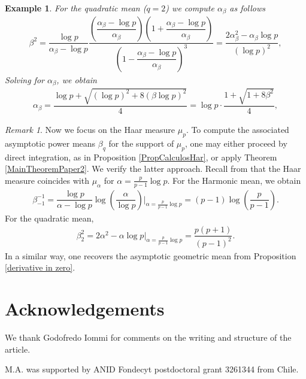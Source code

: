 \documentclass[11pt]{amsart}
\newtheorem{example}{Example}
\theoremstyle{remark}
\newtheorem{remark}[theorem]{Remark}
\numberwithin{equation}{section}
\begin{document}
\begin{example}
    For the quadratic mean ($q=2$) we compute $\alpha_{\beta}$ as follows
    \begin{align*}
        \beta^{2}=\dfrac{\log p}{\alpha_{\beta}-\log p}\dfrac{\left(\dfrac{\alpha_{\beta}-\log p}{\alpha_{\beta}}\right)\left(1+\dfrac{\alpha_{\beta}-\log p}{\alpha_{\beta}}\right)}{\left(1-\dfrac{\alpha_{\beta}-\log p}{\alpha_{\beta}}\right)^{3}}=\dfrac{2\alpha_{\beta}^{2}-\alpha_{\beta}\log p}{\left(\log p\right)^2},
    \end{align*}Solving for $\alpha_\beta$, we obtain
    \begin{align*}
        \alpha_{\beta}=\dfrac{\log p+\sqrt{(\log p)^{2}+8(\beta\log p)^{2}}}{4}=\log p\cdot \dfrac{1+\sqrt{1+8\beta^2}}{4},
    \end{align*}
\end{example}

\begin{remark}
    Now we focus on the Haar measure $\mu_{p}$. To compute the associated asymptotic power means $\beta_{q}$ for the support of $\mu_{p}$, one may either proceed by direct integration, as in Proposition \ref{PropCalculosHar}, or apply Theorem \ref{MainTheoremPaper2}. We verify the latter approach. Recall from \cite[Remark 4.2]{paper1} that the Haar measure coincides with $\mu_{\alpha}$ for $\alpha=\frac{p}{p-1}\log p$. For the Harmonic mean, we obtain
    \begin{align*}
        \beta_{-1}^{-1}=\dfrac{\log p}{\alpha-\log p}\log\left(\dfrac{\alpha}{\log p}\right)\bigg\lvert_{\alpha=\frac{p}{p-1}\log p}=(p-1)\log\left(\dfrac{p}{p-1}\right).
    \end{align*}For the quadratic mean,
    \begin{align*}
        \beta_{2}^{2}=2\alpha^{2}-\alpha\log p\bigg\lvert_{\alpha=\frac{p}{p-1}\log p}=\dfrac{p(p+1)}{(p-1)^{2}}.
    \end{align*} In a similar way, one recovers the asymptotic geometric mean from Proposition \ref{derivative in zero}.
\end{remark}

\section*{Acknowledgements}
We thank Godofredo Iommi for comments on the writing and structure of the article.

M.A. was supported by ANID Fondecyt postdoctoral grant 3261344 from Chile.

 



\end{document}
